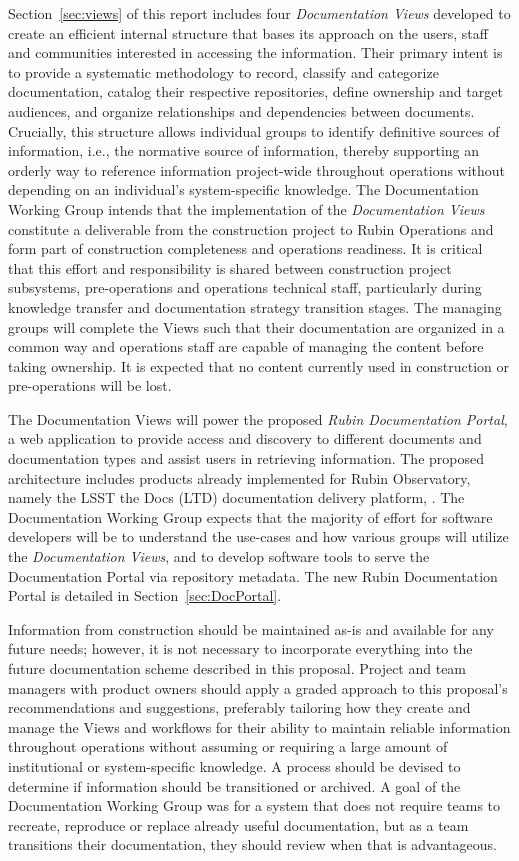 Section~\ref{sec:views} of this report includes four \emph{Documentation Views} developed to create an efficient internal structure that bases its approach on the users, staff and communities interested in accessing the information.
Their primary intent is to provide a systematic methodology to record, classify and categorize documentation, catalog their respective repositories, define ownership and target audiences, and organize relationships and dependencies between documents.
Crucially, this structure allows individual groups to identify definitive sources of information, i.e., the normative source of information, thereby supporting an orderly way to reference information project-wide throughout operations without depending on an individual's system-specific knowledge.
The Documentation Working Group intends that the implementation of the \emph{Documentation Views} constitute a deliverable from the construction project to Rubin Operations and form part of construction completeness and operations readiness.
It is critical that this effort and responsibility is shared between construction project subsystems, pre-operations and operations technical staff, particularly during knowledge transfer and documentation strategy transition stages.
The managing groups will complete the Views such that their documentation are organized in a common way and operations staff are capable of managing the content before taking ownership.
It is expected that no content currently used in construction or pre-operations will be lost.

The Documentation Views will power the proposed \emph{Rubin Documentation Portal}, a web application to provide access and discovery to different documents and documentation types and assist users in retrieving information.
The proposed architecture includes products already implemented for Rubin Observatory, namely the LSST the Docs (LTD) documentation delivery platform,  .
The Documentation Working Group expects that the majority of effort for software developers will be to understand the use-cases and how various groups will utilize the \emph{Documentation Views}, and to develop software tools to serve the Documentation Portal via repository metadata.
The new Rubin Documentation Portal is detailed in Section~\ref{sec:DocPortal}.

Information from construction should be maintained as-is and available for any future needs; however, it is not necessary to incorporate everything into the future documentation scheme described in this proposal.
Project and team managers with product owners should apply a graded approach to this proposal's recommendations and suggestions, preferably tailoring how they create and manage the Views and workflows for their ability to maintain reliable information throughout operations without assuming or requiring a large amount of institutional or system-specific knowledge. 
A process should be devised to determine if information should be transitioned or archived.
A goal of the Documentation Working Group was for a system that does not require teams to recreate, reproduce or replace already useful documentation, but as a team transitions their documentation, they should review when that is advantageous.

